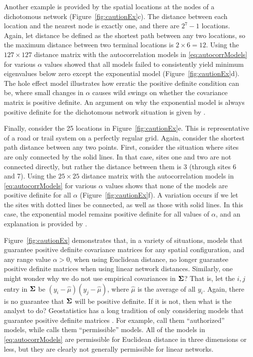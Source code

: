 \documentclass[11pt, titlepage]{article}\usepackage[]{graphicx}\usepackage[]{color}
\begin{document}
\begin{spacing}{1.9}
\begin{flushleft}
Another example is provided by the spatial locations at the nodes of a dichotomous network (Figure~\ref{fig:cautionEx}c). The distance between each location and the nearest node is exactly one, and there are $2^7 - 1$ locations.  Again, let distance be defined as the shortest path between any two locations, so the maximum distance between two terminal locations is $2 \times 6 = 12$.  Using the $127 \times 127$ distance matrix with the autocorrelation models in \ref{eq:autocorrModels} for various $\alpha$ values showed that all models failed to consistently yield minimum eigenvalues below zero except the exponential model (Figure~\ref{fig:cautionEx}d).  The hole effect model illustrates how erratic the positive definite condition can be, where small changes in $\alpha$ causes wild swings on whether the covariance matrix is positive definite. An argument on why the exponential model is always positive definite for the dichotomous network situation is given by \citet{Ver:Pete:Move:2010}.

Finally, consider the 25 locations in Figure~\ref{fig:cautionEx}e.  This is representative of a road or trail system on a perfectly regular grid.  Again, consider the shortest path distance between any two points.  First, consider the situation where sites are only connected by the solid lines.  In that case, sites one and two are not connected directly, but rather the distance between them is 3 (through sites 6 and 7).  Using the $25 \times 25$ distance matrix with the autocorrelation models in \ref{eq:autocorrModels} for various $\alpha$ values shows that none of the models are positive definite for all $\alpha$ (Figure~\ref{fig:cautionEx}f). A variation occurs if we let the sites with dotted lines be connected, as well as those with solid lines.  In this case, the exponential model remains positive definite for all values of $\alpha$, and an explanation is provided by \citet{Curr:NonE:2006}.

Figure~\ref{fig:cautionEx} demonstrates that, in a variety of situations, models that guarantee positive definite covariance matrices for any spatial configuration, and any range value $\alpha > 0$, when using Euclidean distance, no longer guarantee positive definite matrices when using linear network distances. Similarly, one might wonder why we do not use empirical covariances in $\mbox{\boldmath $\Sigma$}$?  That is, let the $i,j$ entry in $\mbox{\boldmath $\Sigma$}$ be $(y_i - \hat{\mu})(y_j - \hat{\mu})$, where $\hat{\mu}$ is the average of all $y_i$.  Again, there is no guarantee that $\mbox{\boldmath $\Sigma$}$ will be positive definite.  If it is not, then what is the analyst to do? Geostatistics has a long tradition of only considering models that guarantee positive definite matrices \citep[][p. 161]{Jour:Huij:mini:1978}. For example, \citet[][p. 80]{Webs:Oliv:geos:2007} call them ``authorized'' models, while \citet[][p. 87]{Goov:geos:1997} calls them ``permissible'' models.  All of the models in \ref{eq:autocorrModels} are permissible for Euclidean distance in three dimensions or less, but they are clearly not generally permissible for linear networks.


\end{flushleft}
\end{spacing}
\end{document}
